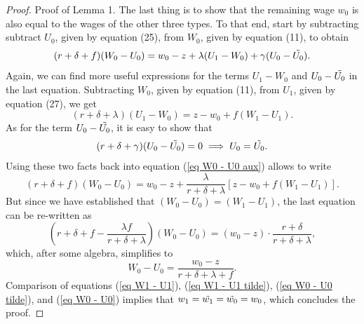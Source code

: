 \documentclass[12pt]{article} %
\theoremstyle{definition}
\begin{document}
\begin{proof}{Proof of Lemma 1.}
The last thing is to show that the remaining wage $w_0$ is also equal to the wages of the other three types. To that end, start by subtracting subtract ${U_0}$, given by equation (25), 
from ${W_0}$, given by equation (11), 
to obtain 
\begin{equation}
(r+\delta+f)(W_0-U_0)=w_0-z+\lambda(U_1-W_0)+\gamma(U_0-\Tilde{U_0}).\label{eq W0 - U0 aux} 
\end{equation}Again, we can find more useful expressions for the terms $U_1-W_0$ and $U_0-\Tilde{U_0}$ in the last equation. Subtracting $W_0$, given by equation (11), 
from $U_1$, given by equation (27), 
we get 
\begin{equation*}
   (r+\delta+\lambda)(U_1-W_0)=z-w_0+f(W_1-U_1).
  \end{equation*}
As for the term $U_0-\Tilde{U_0}$, it is easy to show that 
\begin{equation*} 
(r+\delta+\gamma)(U_0-\Tilde{U_0})=0 \implies U_0=\Tilde{U_0}. 
\end{equation*}Using these two facts back into equation (\ref{eq W0 - U0 aux}) allows to write  
\begin{equation}
(r+\delta+f)(W_0-U_0)=w_0-z+\frac{\lambda}{r+\delta+\lambda}[z-w_0+f(W_1-U_1)].\nonumber 
\end{equation}But since we have established that $(W_0-U_0)=(W_1-U_1)$, the last equation can be re-written as \begin{equation*}
   \left(r+\delta+f-\frac{\lambda f}{r+\delta+\lambda}\right)(W_0-U_0)=(w_0-z)\cdot \frac{r+\delta}{r+\delta+\lambda},  
   \end{equation*}which, after some algebra, simplifies to  
\begin{equation}
      W_0-U_0 = \frac{w_0-z}{r+\delta+\lambda+f}.\label{eq W0 - U0}  
\end{equation}Comparison of equations (\ref{eq W1 - U1}), (\ref{eq W1 - U1 tilde}), (\ref{eq W0 - U0 tilde}), and (\ref{eq W0 - U0}) implies that $w_1=\tilde{w_1}=\Tilde{w_0}=w_0$, which concludes the proof.\end{proof} 



\iffalse
\end{document}
